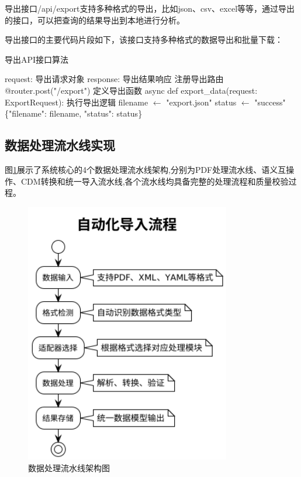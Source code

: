 导出接口/api/export支持多种格式的导出，比如json、csv、excel等等，通过导出的接口，可以把查询的结果导出到本地进行分析。

导出接口的主要代码片段如下，该接口支持多种格式的数据导出和批量下载：

\begin{algorithm}[H]
\caption{导出API接口算法}
\begin{algorithmic}[1]
\REQUIRE request: 导出请求对象
\ENSURE response: 导出结果响应
\STATE 注册导出路由
\STATE @router.post("/export")
\STATE 定义导出函数
\STATE async def export\_data(request: ExportRequest):
\STATE     执行导出逻辑
\STATE     filename $\leftarrow$ "export.json"
\STATE     status $\leftarrow$ "success"
\STATE     \RETURN \{"filename": filename, "status": status\}
\end{algorithmic}
\end{algorithm}

\subsection{数据处理流水线实现}

图\ref{fig_data_processing_pipeline}展示了系统核心的4个数据处理流水线架构,分别为PDF处理流水线、语义互操作、CDM转换和统一导入流水线,各个流水线均具备完整的处理流程和质量校验过程。

\begin{figure}[H]
    \centering
    \includegraphics[width=0.8\textwidth,height=0.5\textheight,keepaspectratio]{chapters/fig-0/data_processing_pipeline.png}
    \caption{数据处理流水线架构图}
    \label{fig_data_processing_pipeline}
\end{figure}

